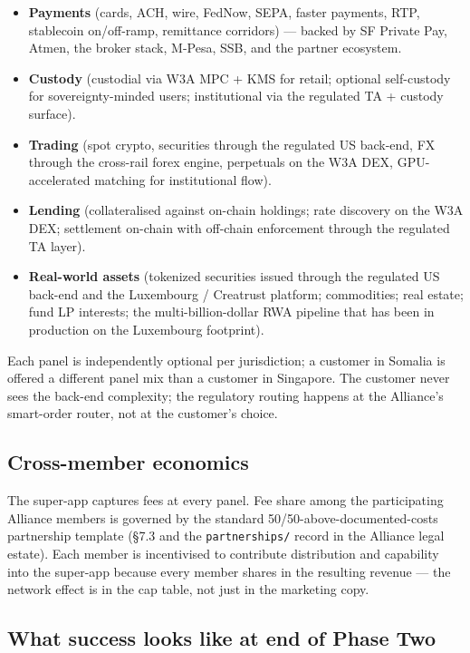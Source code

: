 \begin{itemize}[leftmargin=2em,itemsep=0.1em]
\item \textbf{Payments} (cards, ACH, wire, FedNow, SEPA, faster
payments, RTP, stablecoin on/off-ramp, remittance corridors)
--- backed by SF Private Pay, Atmen, the broker stack, M-Pesa, SSB, and
the partner ecosystem.
\item \textbf{Custody} (custodial via W3A MPC + KMS for retail; optional
self-custody for sovereignty-minded users; institutional via the
regulated TA + custody surface).
\item \textbf{Trading} (spot crypto, securities through the regulated US
back-end, FX through the cross-rail forex engine, perpetuals on the W3A
DEX, GPU-accelerated matching for institutional flow).
\item \textbf{Lending} (collateralised against on-chain holdings; rate
discovery on the W3A DEX; settlement on-chain with off-chain enforcement
through the regulated TA layer).
\item \textbf{Real-world assets} (tokenized securities issued through the
regulated US back-end and the Luxembourg / Creatrust platform; commodities;
real estate; fund LP interests; the multi-billion-dollar RWA pipeline
that has been in production on the Luxembourg footprint).
\end{itemize}

Each panel is independently optional per jurisdiction; a customer in
Somalia is offered a different panel mix than a customer in Singapore.
The customer never sees the back-end complexity; the regulatory routing
happens at the Alliance's smart-order router, not at the customer's
choice.

\subsection{Cross-member economics}

The super-app captures fees at every panel. Fee share among the
participating Alliance members is governed by the standard
50/50-above-documented-costs partnership template (\S 7.3 and the
\texttt{partnerships/} record in the Alliance legal estate). Each
member is incentivised to contribute distribution and capability into
the super-app because every member shares in the resulting revenue ---
the network effect is in the cap table, not just in the marketing copy.

\subsection{What success looks like at end of Phase Two}

